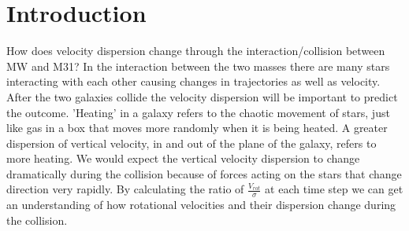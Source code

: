 \documentclass[linenumbers,trackchanges]{aastex7}
\begin{document}
\author{Matan Lagnado}






\section{Introduction} 

How does velocity dispersion change through the interaction/collision between MW and M31? In the interaction between the two masses there are many stars interacting with each other causing changes in trajectories as well as velocity. After the two galaxies collide the velocity dispersion will be important to predict the outcome. 'Heating' in a galaxy refers to the chaotic movement of stars, just like gas in a box that moves more randomly when it is being heated. A greater dispersion of vertical velocity, in and out of the plane of the galaxy, refers to more heating. We would expect the vertical velocity dispersion to change dramatically during the collision because of forces acting on the stars that change direction very rapidly. By calculating the ratio of  $\frac{V_{rot}}{\sigma}$ at each time step we can get an understanding of how rotational velocities and their dispersion change during the collision.
\end{document}
